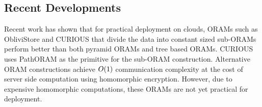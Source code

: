 \subsection{Recent Developments}
\label{oram:related:recent}
%
Recent work \cite{curious} has shown that for practical deployment on clouds, ORAMs such as ObliviStore \cite{oblivistore} and CURIOUS \cite{curious} that 
divide the data into constant sized sub-ORAMs perform better than both pyramid ORAMs and tree based ORAMs. CURIOUS uses PathORAM as the primitive for the 
sub-ORAM construction. 
Alternative ORAM constructions \cite{onionoram,comporam} achieve $O(1)$ communication complexity at the cost of server side computation using 
homomorphic encryption. However, due to expensive homomorphic computations, these ORAMs are not yet practical for deployment.